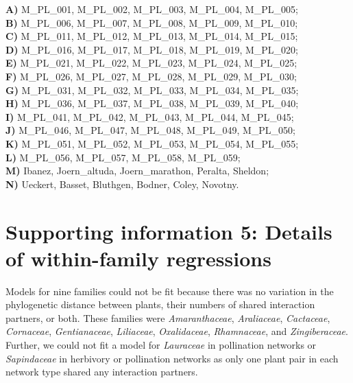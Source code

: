 \documentclass[12pt]{article}
\begin{document}
\begin{spacing}{1.5}
    \noindent \textbf{A)} M\_PL\_001, M\_PL\_002, M\_PL\_003, M\_PL\_004, M\_PL\_005;      \\
    \textbf{B)} M\_PL\_006, M\_PL\_007, M\_PL\_008, M\_PL\_009, M\_PL\_010;    \\
    \textbf{C)} M\_PL\_011, M\_PL\_012, M\_PL\_013, M\_PL\_014, M\_PL\_015;  \\
    \textbf{D)} M\_PL\_016, M\_PL\_017, M\_PL\_018, M\_PL\_019, M\_PL\_020;   \\
    \textbf{E)} M\_PL\_021, M\_PL\_022, M\_PL\_023, M\_PL\_024, M\_PL\_025;  \\
    \textbf{F)} M\_PL\_026, M\_PL\_027, M\_PL\_028, M\_PL\_029, M\_PL\_030;  \\
    \textbf{G)} M\_PL\_031, M\_PL\_032, M\_PL\_033, M\_PL\_034, M\_PL\_035; \\
    \textbf{H)} M\_PL\_036, M\_PL\_037, M\_PL\_038, M\_PL\_039, M\_PL\_040;   \\
    \textbf{I)} M\_PL\_041, M\_PL\_042, M\_PL\_043, M\_PL\_044, M\_PL\_045;\\
    \textbf{J)} M\_PL\_046, M\_PL\_047, M\_PL\_048, M\_PL\_049, M\_PL\_050;  \\
    \textbf{K)} M\_PL\_051, M\_PL\_052, M\_PL\_053, M\_PL\_054, M\_PL\_055;   \\
    \textbf{L)} M\_PL\_056, M\_PL\_057, M\_PL\_058, M\_PL\_059;  \\
    \textbf{M)} Ibanez, Joern\_altuda, Joern\_marathon, Peralta, Sheldon;  \\
    \textbf{N)} Ueckert, Basset, Bluthgen, Bodner, Coley, Novotny.

\clearpage

\section*{Supporting information 5: Details of within-family regressions}

    Models for nine families could not be fit because there was no variation in the phylogenetic distance between plants, their numbers of shared interaction partners, or both. These families were \emph{Amaranthaceae}, \emph{Araliaceae}, \emph{Cactaceae}, \emph{Cornaceae}, \emph{Gentianaceae}, \emph{Liliaceae}, \emph{Oxalidaceae}, \emph{Rhamnaceae}, and \emph{Zingiberaceae}. Further, we could not fit a model for \emph{Lauraceae} in pollination networks or \emph{Sapindaceae} in herbivory or pollination networks as only one plant pair in each network type shared any interaction partners.



\end{spacing}
\end{document}
